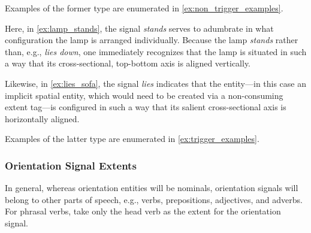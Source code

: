 \documentclass[11pt]{article}
\begin{document}

Examples of the former type are enumerated in \cref{ex:non_trigger_examples}.

\label{ex:non_trigger_examples}

Here, in \cref{ex:lamp_stands}, the signal \emph{stands} serves to adumbrate in what configuration the lamp is arranged individually. Because the lamp \emph{stands} rather than, e.g., \emph{lies down}, one immediately recognizes that the lamp is situated in such a way that its cross-sectional, top-bottom axis is aligned vertically.

Likewise, in \cref{ex:lies_sofa}, the signal \emph{lies} indicates that the entity---in this case an implicit spatial entity, which would need to be created via a non-consuming extent tag---is configured in such a way that its salient cross-sectional axis is horizontally aligned. 

Examples of the latter type are enumerated in \cref{ex:trigger_examples}.

\label{ex:trigger_examples}


\subsubsection{Orientation Signal Extents} %
\label{ssub:orientation_signal_extents}
In general, whereas orientation entities will be nominals, orientation signals will belong to other parts of speech, e.g., verbs, prepositions, adjectives, and adverbs. For phrasal verbs, take only the head verb as the extent for the orientation signal.
\end{document}
